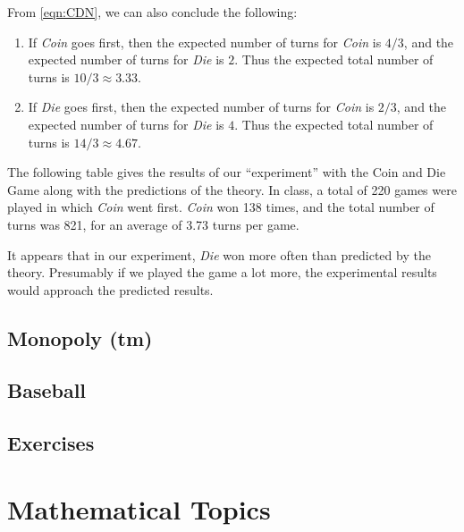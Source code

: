 \documentclass{book}
\begin{document}
From \eqref{eqn:CDN}, we can also conclude the following:
\begin{enumerate}
\item If \emph{Coin} goes first, then the expected number of
turns for \emph{Coin} is $4/3$, and the expected number of
turns for \emph{Die} is $2$.  Thus the expected total number
of turns is $10/3\approx 3.33$.
\item If \emph{Die} goes first, then the expected number of
turns for \emph{Coin} is $2/3$, and the expected number of
turns for \emph{Die} is $4$.  Thus the expected total number
of turns is $14/3\approx 4.67$.
\end{enumerate}

The following table gives the results of our
``experiment'' with the Coin and Die Game along with
the predictions of the theory.
In class, a total of 220 games were played in which
\emph{Coin} went first.
\emph{Coin} won 138 times, and the total number of
turns was 821, for an average of 3.73 turns per game.

\medskip
\centerline{
}

\medskip
It appears that in our experiment, \emph{Die} won more
often than predicted by the theory.
Presumably if we played the game a lot more, the
experimental results would approach the predicted results.


\section{Monopoly (tm)}
\section{Baseball}
\section{Exercises}
%
\appendix
%
%
%

\chapter{Mathematical Topics}
%
%
\end{document}
